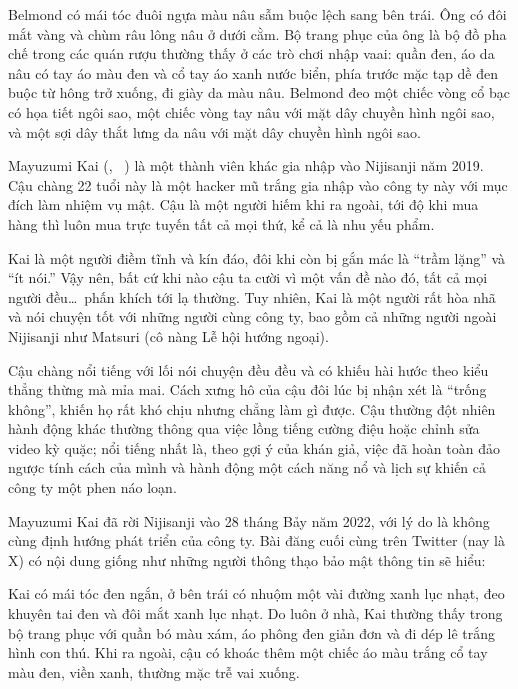 \documentclass[../main.tex]{subfiles}
\begin{document}

Belmond có mái tóc đuôi ngựa màu nâu sẫm buộc lệch sang bên trái. Ông có đôi mắt vàng và chùm râu lông nâu ở dưới cằm. Bộ trang phục của ông là bộ đồ pha chế trong các quán rượu thường thấy ở các trò chơi nhập vaai: quần đen, áo da nâu có tay áo màu đen và cổ tay áo xanh nước biển, phía trước mặc tạp dề đen buộc từ hông trở xuống, đi giày da màu nâu. Belmond đeo một chiếc vòng cổ bạc có họa tiết ngôi sao, một chiếc vòng tay nâu với mặt dây chuyền hình ngôi sao, và một sợi dây thắt lưng da nâu với mặt dây chuyền hình ngôi sao.

Mayuzumi Kai (, \ ) là một thành viên khác gia nhập vào Nijisanji năm 2019. Cậu chàng 22 tuổi này là một hacker mũ trắng gia nhập vào công ty này với mục đích làm nhiệm vụ mật. Cậu là một người hiếm khi ra ngoài, tới độ khi mua hàng thì luôn mua trực tuyến tất cả mọi thứ, kể cả là nhu yếu phẩm.

Kai là một người điềm tĩnh và kín đáo, đôi khi còn bị gắn mác là ``trầm lặng'' và ``ít nói.'' Vậy nên, bất cứ khi nào cậu ta cười vì một vấn đề nào đó, tất cả mọi người đều\dots\ phấn khích tới lạ thường. Tuy nhiên, Kai là một người rất hòa nhã và nói chuyện tốt với những người cùng công ty, bao gồm cả những người ngoài Nijisanji như Matsuri (cô nàng Lễ hội hướng ngoại).

Cậu chàng nổi tiếng với lối nói chuyện đều đều và có khiếu hài hước theo kiểu thẳng thừng mà mỉa mai. Cách xưng hô của cậu đôi lúc bị nhận xét là ``trống không'', khiến họ rất khó chịu nhưng chẳng làm gì được. Cậu thường đột nhiên hành động khác thường thông qua việc lồng tiếng cường điệu hoặc chỉnh sửa video kỳ quặc; nổi tiếng nhất là, theo gợi ý của khán giả, việc đã hoàn toàn đảo ngược tính cách của mình và hành động một cách năng nổ và lịch sự khiến cả công ty một phen náo loạn.

Mayuzumi Kai đã rời Nijisanji vào 28 tháng Bảy năm 2022, với lý do là không cùng định hướng phát triển của công ty. Bài đăng cuối cùng trên Twitter (nay là X) có nội dung giống như những người thông thạo bảo mật thông tin sẽ hiểu:


Kai có mái tóc đen ngắn, ở bên trái có nhuộm một vài đường xanh lục nhạt, đeo khuyên tai đen và đôi mắt xanh lục nhạt. Do luôn ở nhà, Kai thường thấy trong bộ trang phục với quần bó màu xám, áo phông đen giản đơn và đi dép lê trắng hình con thú. Khi ra ngoài, cậu có khoác thêm một chiếc áo màu trắng cổ tay màu đen, viền xanh, thường mặc trễ vai xuống.
\end{document}
